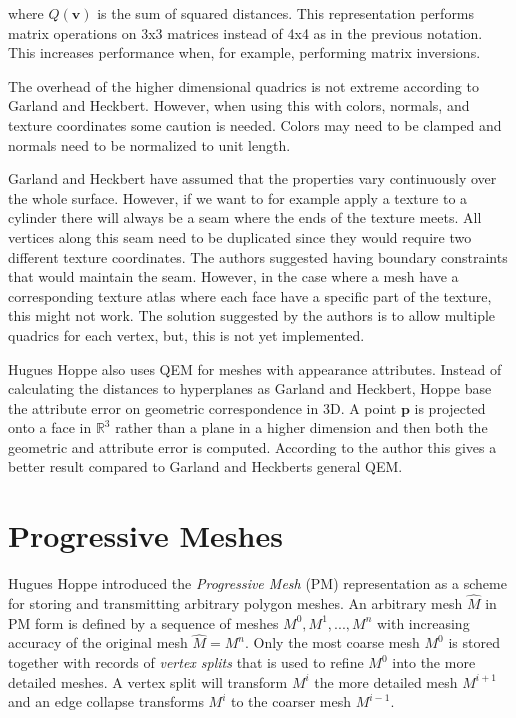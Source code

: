 where \(Q(\mathbf{v})\) is the sum of squared distances. This representation performs matrix operations on 3x3 matrices instead of 4x4 as in the previous notation. This increases performance when, for example, performing matrix inversions.

The overhead of the higher dimensional quadrics is not extreme according to Garland and Heckbert. However, when using this with colors, normals, and texture coordinates some caution is needed. Colors may need to be clamped and normals need to be normalized to unit length.

Garland and Heckbert have assumed that the properties vary continuously over the whole surface. However, if we want to for example apply a texture to a cylinder there will always be a seam where the ends of the texture meets. All vertices along this seam need to be duplicated since they would require two different texture coordinates. The authors suggested having boundary constraints that would maintain the seam. However, in the case where a mesh have a corresponding texture atlas where each face have a specific part of the texture, this might not work. The solution suggested by the authors is to allow multiple quadrics for each vertex, but, this is not yet implemented.

Hugues Hoppe \cite{Hoppe:1999:NQM:319351.319357} also uses QEM for meshes with appearance attributes. Instead of calculating the distances to hyperplanes as Garland and Heckbert, Hoppe base the attribute error on geometric correspondence in 3D. A point \(\mathbf{p}\) is projected onto a face in \(\mathbb{R}^3\) rather than a plane in a higher dimension and then both the geometric and attribute error is computed. According to the author this gives a better result compared to Garland and Heckberts general QEM.

\section{Progressive Meshes} \label{sec:progressive_meshes}
Hugues Hoppe \cite{hoppe1996progressive} introduced the \emph{Progressive Mesh} (PM) representation as a scheme for storing and transmitting arbitrary polygon meshes. An arbitrary mesh $\hat{M}$ in PM form is defined by a sequence of meshes $M^0, M^1, ..., M^n$ with increasing accuracy of the original mesh $\hat{M} = M^n$. Only the most coarse mesh $M^0$ is stored together with records of \emph{vertex splits} that is used to refine $M^0$ into the more detailed meshes. A vertex split will transform $M^i$ the more detailed mesh $M^{i+1}$ and an edge collapse transforms $M^i$ to the coarser mesh $M^{i-1}$.

